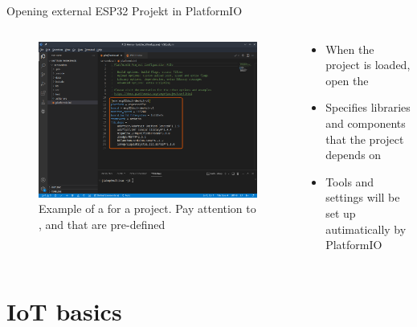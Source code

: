 \documentclass[aspectratio=169]{beamer}
\begin{document}
\begin{frame}{Opening external ESP32 Projekt in PlatformIO}
\begin{columns}
	\begin{column}{0.5\textwidth}
		\begin{figure}
  			\includegraphics[width=\textwidth,keepaspectratio=true]{assets/pictures/pio-projects-6.png}
  			\caption{Example of a  for a project. Pay attention to ,  and  that are pre-defined}
  			\label{fig:pio-project6}
		\end{figure}
	\end{column}
	\begin{column}{0.5\textwidth}
		\begin{textBox}
			\begin{itemize}
				\item When the project is loaded, open the 
				\item Specifies libraries and components that the project depends on
				\item Tools and settings will be set up autimatically by PlatformIO
			\end{itemize}
		\end{textBox}
	\end{column}
\end{columns}
\end{frame}

\section{IoT basics}
\begin{frame}
\end{frame}
\end{document}
